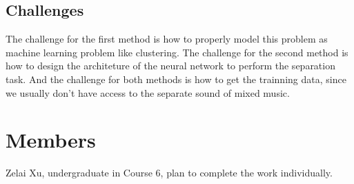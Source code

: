 \documentclass{article}
\begin{document}
\subsection{Challenges}
The challenge for the first method is how to properly model this problem as machine learning problem like clustering. The challenge for the second method is how to design the architeture of the neural network to perform the separation task. And the challenge for both methods is how to get the trainning data, since we usually don't have access to the separate sound of mixed music.

\section{Members}
Zelai Xu, undergraduate in Course 6, plan to complete the work individually.
\end{document}
